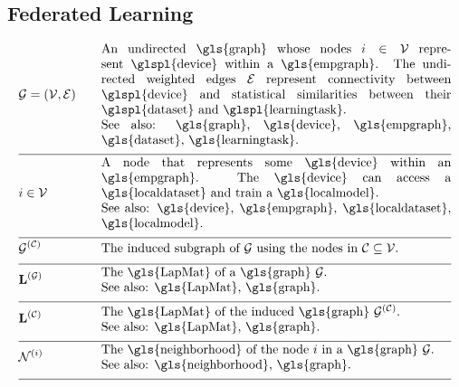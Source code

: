 \newpage
\subsection*{Federated Learning}

\begin{align}
 	&\graph = \pair{\nodes}{\edges} & \quad & \parbox{.80\textwidth}{An undirected \gls{graph} whose nodes $\nodeidx \in \nodes$ represent 
		\glspl{device} within a \gls{empgraph}. The undirected weighted edges $\edges$ represent connectivity between 
		\glspl{device} and statistical similarities between their \glspl{dataset} and \glspl{learningtask}.
		\\ See also: \gls{graph}, \gls{device}, \gls{empgraph}, \gls{dataset}, \gls{learningtask}. }\nonumber \\[2mm] \hline \nonumber\\[-5mm]
	&\nodeidx \in \nodes& \quad & \parbox{.80\textwidth}{A node that represents some 
		\gls{device} within an \gls{empgraph}. The \gls{device} can access a \gls{localdataset} and train a \gls{localmodel}.
		\\ See also: \gls{device}, \gls{empgraph}, \gls{localdataset}, \gls{localmodel}. }\nonumber \\[2mm] \hline \nonumber\\[-5mm]
	&\indsubgraph{\graph}{\cluster}& \quad & \parbox{.80\textwidth}{The induced subgraph of $\graph$ using the nodes in $\cluster \subseteq \nodes$. } \nonumber \\[2mm] \hline \nonumber\\[-5mm]
	&\LapMat{\graph}   & \quad & \parbox{.80\textwidth}{The \gls{LapMat} of a \gls{graph} $\graph$.
		\\ See also: \gls{LapMat}, \gls{graph}. }\nonumber \\[2mm] \hline \nonumber\\[-5mm]
	&\LapMat{\cluster}   & \quad & \parbox{.80\textwidth}{The \gls{LapMat} of the induced \gls{graph} $\indsubgraph{\graph}{\cluster}$.
		\\ See also: \gls{LapMat}, \gls{graph}. } \nonumber \\[2mm] \hline \nonumber\\[-5mm]
	 &\neighbourhood{\nodeidx}  & \quad & \parbox{.80\textwidth}{The \gls{neighborhood} of the node $\nodeidx$ in a \gls{graph} $\graph$.
	 	\\ See also: \gls{neighborhood}, \gls{graph}. }   \nonumber \\[2mm] \hline \nonumber\\[-5mm]

\end{align}
